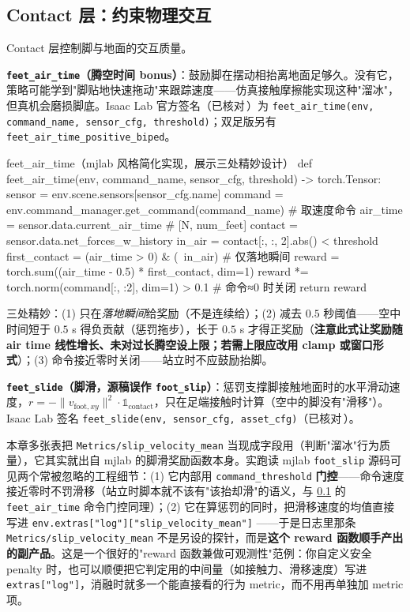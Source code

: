 \subsection{Contact 层：约束物理交互}
\label{sec:rlmc-rew-contact}

Contact 层控制脚与地面的交互质量。

\textbf{\texttt{feet\_air\_time}（腾空时间 bonus）}：鼓励脚在摆动相抬离地面足够久。没有它，策略可能学到"脚贴地快速拖动"来跟踪速度——仿真接触摩擦能实现这种"溜冰"，但真机会磨损脚底。Isaac Lab 官方签名（已核对\,\cite{isaaclab2024}）为 \verb|feet_air_time(env, command_name, sensor_cfg, threshold)|；双足版另有 \verb|feet_air_time_positive_biped|。

\begin{codebox}[Python]{feet\_air\_time（mjlab 风格简化实现，展示三处精妙设计）}
def feet_air_time(env, command_name, sensor_cfg, threshold) -> torch.Tensor:
    sensor = env.scene.sensors[sensor_cfg.name]
    command = env.command_manager.get_command(command_name)   # 取速度命令
    air_time = sensor.data.current_air_time               # [N, num_feet]
    contact = sensor.data.net_forces_w_history
    in_air = contact[:, :, 2].abs() < threshold
    first_contact = (air_time > 0) & (~in_air)            # 仅落地瞬间
    reward = torch.sum((air_time - 0.5) * first_contact, dim=1)
    reward *= torch.norm(command[:, :2], dim=1) > 0.1     # 命令≈0 时关闭
    return reward
\end{codebox}

三处精妙：(1) 只在\emph{落地瞬间}给奖励（不是连续给）；(2) 减去 $0.5$ 秒阈值——空中时间短于 $0.5$ s 得负贡献（惩罚拖步），长于 $0.5$ s 才得正奖励（\textbf{注意此式让奖励随 air time 线性增长、未对过长腾空设上限；若需上限应改用 clamp 或窗口形式}）；(3) 命令接近零时关闭——站立时不应鼓励抬脚。

\textbf{\texttt{feet\_slide}（脚滑，源稿误作 \texttt{foot\_slip}）}：惩罚支撑脚接触地面时的水平滑动速度，$r=-\lVert v_{\text{foot},xy}\rVert^2\cdot\mathbb 1_{\text{contact}}$，只在足端接触时计算（空中的脚没有"滑移"）。Isaac Lab 签名 \verb|feet_slide(env, sensor_cfg, asset_cfg)|（已核对\,\cite{isaaclab2024}）。

\begin{note}
本章多张表把 \verb|Metrics/slip_velocity_mean| 当现成字段用（判断"溜冰"行为质量），它其实就出自 mjlab 的脚滑奖励函数本身。实跑读 mjlab \verb|foot_slip| 源码可见两个常被忽略的工程细节：(1) 它内部用 \verb|command_threshold| \textbf{门控}——命令速度接近零时不罚滑移（站立时脚本就不该有"该抬却滑"的语义，与 \cref{sec:rlmc-rew-contact} 的 \verb|feet_air_time| 命令门控同理）；(2) 它在算惩罚的同时，把滑移速度的均值直接写进 \verb|env.extras["log"]["slip_velocity_mean"]| ——于是日志里那条 \verb|Metrics/slip_velocity_mean| 不是另设的探针，而是\textbf{这个 reward 函数顺手产出的副产品}。这是一个很好的"reward 函数兼做可观测性"范例：你自定义安全 penalty 时，也可以顺便把它判定用的中间量（如接触力、滑移速度）写进 \verb|extras["log"]|，消融时就多一个能直接看的行为 metric，而不用再单独加 metric 项。
\end{note}

